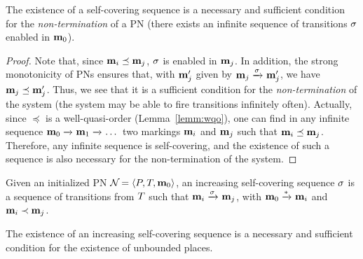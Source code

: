 \begin{lemm}
	\label{theo:self-cov-non-termination}
	The existence of a self-covering sequence is a necessary and sufficient condition for the \emph{non-termination} of a PN (\ie there exists an infinite sequence of transitions $\seqt$ enabled in $\mathbf{m}_0$).
\end{lemm}

\begin{proof}
Note that, since $\mathbf{m}_i \preceq \mathbf{m}_j$, $\seqt$ is enabled in $\mathbf{m}_j$.
In addition, the strong monotonicity of \acp{PN} ensures that, with $\mathbf{m}'_j$ given by $\mar_j \fire{\seqt} \mar'_j$, we have $\mathbf{m}_j \preceq \mathbf{m}'_j$.
Thus, we see that it is a sufficient condition for the \emph{non-termination} of the system (the system may be able to fire transitions infinitely often).
Actually, since $\preceq$ is a well-quasi-order (Lemma~\ref{lemm:wqo}), one can find in any infinite sequence $\mathbf{m}_0 \xrightarrow{}_{} \mathbf{m}_1 \xrightarrow{}_{} \dots$ two markings $\mathbf{m}_i$ and $\mathbf{m}_j$ such that $\mathbf{m}_i \preceq \mathbf{m}_j$.
Therefore, any infinite sequence is self-covering, and the existence of such a sequence is also necessary for the non-termination of the system.
\end{proof}

\begin{defi}
  Given an initialized \ac{PN} $\defPN$,
  an increasing self-covering sequence $\seqt$ is a sequence of transitions from $T$ such that
  \(
    \mar_i \fire{\seqt} \mar_j
  \),
  with $\mathbf{m}_0 \xrightarrow{*}_{} \mathbf{m}_i$
  and $\mathbf{m}_i \prec \mathbf{m}_j$.
\end{defi}

\begin{lemm}
	\label{theo:self-cov-non-termination}
	The existence of an increasing self-covering sequence is a necessary and sufficient condition for the existence of unbounded places.
\end{lemm}

